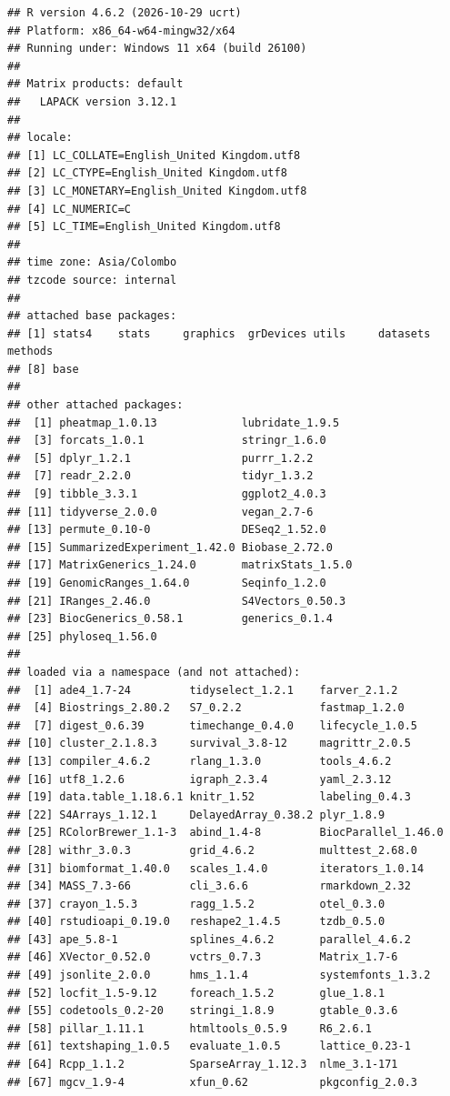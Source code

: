 \documentclass[
]{article}
\begin{document}
\begin{verbatim}
## R version 4.6.2 (2026-10-29 ucrt)
## Platform: x86_64-w64-mingw32/x64
## Running under: Windows 11 x64 (build 26100)
## 
## Matrix products: default
##   LAPACK version 3.12.1
## 
## locale:
## [1] LC_COLLATE=English_United Kingdom.utf8 
## [2] LC_CTYPE=English_United Kingdom.utf8   
## [3] LC_MONETARY=English_United Kingdom.utf8
## [4] LC_NUMERIC=C                           
## [5] LC_TIME=English_United Kingdom.utf8    
## 
## time zone: Asia/Colombo
## tzcode source: internal
## 
## attached base packages:
## [1] stats4    stats     graphics  grDevices utils     datasets  methods  
## [8] base     
## 
## other attached packages:
##  [1] pheatmap_1.0.13             lubridate_1.9.5            
##  [3] forcats_1.0.1               stringr_1.6.0              
##  [5] dplyr_1.2.1                 purrr_1.2.2                
##  [7] readr_2.2.0                 tidyr_1.3.2                
##  [9] tibble_3.3.1                ggplot2_4.0.3              
## [11] tidyverse_2.0.0             vegan_2.7-6                
## [13] permute_0.10-0              DESeq2_1.52.0              
## [15] SummarizedExperiment_1.42.0 Biobase_2.72.0             
## [17] MatrixGenerics_1.24.0       matrixStats_1.5.0          
## [19] GenomicRanges_1.64.0        Seqinfo_1.2.0              
## [21] IRanges_2.46.0              S4Vectors_0.50.3           
## [23] BiocGenerics_0.58.1         generics_0.1.4             
## [25] phyloseq_1.56.0            
## 
## loaded via a namespace (and not attached):
##  [1] ade4_1.7-24         tidyselect_1.2.1    farver_2.1.2       
##  [4] Biostrings_2.80.2   S7_0.2.2            fastmap_1.2.0      
##  [7] digest_0.6.39       timechange_0.4.0    lifecycle_1.0.5    
## [10] cluster_2.1.8.3     survival_3.8-12     magrittr_2.0.5     
## [13] compiler_4.6.2      rlang_1.3.0         tools_4.6.2        
## [16] utf8_1.2.6          igraph_2.3.4        yaml_2.3.12        
## [19] data.table_1.18.6.1 knitr_1.52          labeling_0.4.3     
## [22] S4Arrays_1.12.1     DelayedArray_0.38.2 plyr_1.8.9         
## [25] RColorBrewer_1.1-3  abind_1.4-8         BiocParallel_1.46.0
## [28] withr_3.0.3         grid_4.6.2          multtest_2.68.0    
## [31] biomformat_1.40.0   scales_1.4.0        iterators_1.0.14   
## [34] MASS_7.3-66         cli_3.6.6           rmarkdown_2.32     
## [37] crayon_1.5.3        ragg_1.5.2          otel_0.3.0         
## [40] rstudioapi_0.19.0   reshape2_1.4.5      tzdb_0.5.0         
## [43] ape_5.8-1           splines_4.6.2       parallel_4.6.2     
## [46] XVector_0.52.0      vctrs_0.7.3         Matrix_1.7-6       
## [49] jsonlite_2.0.0      hms_1.1.4           systemfonts_1.3.2  
## [52] locfit_1.5-9.12     foreach_1.5.2       glue_1.8.1         
## [55] codetools_0.2-20    stringi_1.8.9       gtable_0.3.6       
## [58] pillar_1.11.1       htmltools_0.5.9     R6_2.6.1           
## [61] textshaping_1.0.5   evaluate_1.0.5      lattice_0.23-1     
## [64] Rcpp_1.1.2          SparseArray_1.12.3  nlme_3.1-171       
## [67] mgcv_1.9-4          xfun_0.62           pkgconfig_2.0.3
\end{verbatim}
\end{document}
